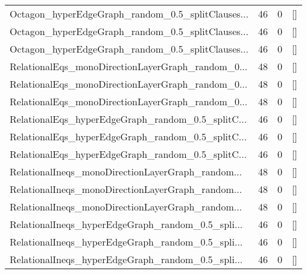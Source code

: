 \begin{table}
\begin{tabular}{lrrl}
 Octagon\_hyperEdgeGraph\_random\_0.5\_splitClauses... &               46 &                     0 &                       [] \\
 Octagon\_hyperEdgeGraph\_random\_0.5\_splitClauses... &               46 &                     0 &                       [] \\
 Octagon\_hyperEdgeGraph\_random\_0.5\_splitClauses... &               46 &                     0 &                       [] \\
 RelationalEqs\_monoDirectionLayerGraph\_random\_0... &               48 &                     0 &                       [] \\
 RelationalEqs\_monoDirectionLayerGraph\_random\_0... &               48 &                     0 &                       [] \\
 RelationalEqs\_monoDirectionLayerGraph\_random\_0... &               48 &                     0 &                       [] \\
 RelationalEqs\_hyperEdgeGraph\_random\_0.5\_splitC... &               46 &                     0 &                       [] \\
 RelationalEqs\_hyperEdgeGraph\_random\_0.5\_splitC... &               46 &                     0 &                       [] \\
 RelationalEqs\_hyperEdgeGraph\_random\_0.5\_splitC... &               46 &                     0 &                       [] \\
 RelationalIneqs\_monoDirectionLayerGraph\_random... &               48 &                     0 &                       [] \\
 RelationalIneqs\_monoDirectionLayerGraph\_random... &               48 &                     0 &                       [] \\
 RelationalIneqs\_monoDirectionLayerGraph\_random... &               48 &                     0 &                       [] \\
 RelationalIneqs\_hyperEdgeGraph\_random\_0.5\_spli... &               46 &                     0 &                       [] \\
 RelationalIneqs\_hyperEdgeGraph\_random\_0.5\_spli... &               46 &                     0 &                       [] \\
 RelationalIneqs\_hyperEdgeGraph\_random\_0.5\_spli... &               46 &                     0 &                       [] \\
\bottomrule
\end{tabular}
\end{table}